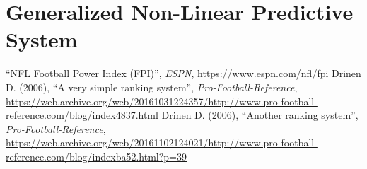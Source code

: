 \documentclass{report}
\begin{document}
\chapter{Generalized Non-Linear Predictive System}

\begin{thebibliography}{9}
     ``NFL Football Power Index (FPI)'', \textit{ESPN}, \url{https://www.espn.com/nfl/fpi}
     Drinen D. (2006), ``A very simple ranking system'', \textit{Pro-Football-Reference}, \url{https://web.archive.org/web/20161031224357/http://www.pro-football-reference.com/blog/index4837.html}
     Drinen D. (2006), ``Another ranking system'', \textit{Pro-Football-Reference}, \url{https://web.archive.org/web/20161102124021/http://www.pro-football-reference.com/blog/indexba52.html?p=39}
\end{thebibliography}
\end{document}
